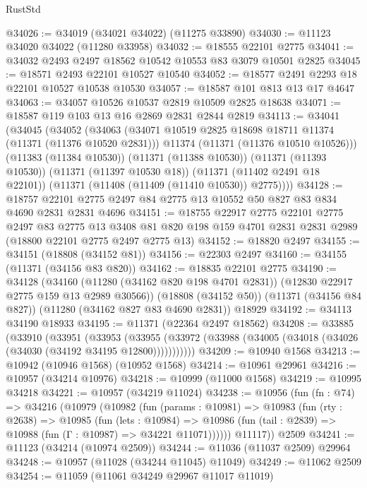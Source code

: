 \begin{lexlean}{RustStd}
\begin{coremodule}
@34026 := @34019 (@34021 @34022) (@11275 @33890)
@34030 := @11123 @34020 @34022 (@11280 @33958)
@34032 := @18555 @22101 @2775
@34041 := @34032 @2493 @2497 @18562 @10542 @10553 @83 @3079 @10501 @2825
@34045 := @18571 @2493 @22101 @10527 @10540
@34052 := @18577 @2491 @2293 @18 @22101 @10527 @10538 @10530
@34057 := @18587 @101 @813 @13 @17 @4647
@34063 := @34057 @10526 @10537 @2819 @10509 @2825 @18638
@34071 := @18587 @119 @103 @13 @16 @2869 @2831 @2844 @2819
@34113 := @34041
    (@34045
      (@34052
        (@34063
          (@34071 @10519 @2825 @18698 @18711 @11374 (@11371 (@11376 @10520 @2831)))
          @11374
          (@11371 (@11376 @10510 @10526)))
        (@11383 (@11384 @10530))
        (@11371 (@11388 @10530))
        (@11371 (@11393 @10530))
        (@11371 (@11397 @10530 @18))
        (@11371 (@11402 @2491 @18 @22101))
        (@11371 (@11408 (@11409 (@11410 @10530)) @2775))))
@34128 := @18757 @22101 @2775 @2497 @84 @2775 @13 @10552 @50 @827 @83 @834 @4690 @2831 @2831 @4696
@34151 := @18755
    @22917
    @2775
    @22101
    @2775
    @2497
    @83
    @2775
    @13
    @3408
    @81
    @820
    @198
    @159
    @4701
    @2831
    @2831
    @2989
    (@18800 @22101 @2775 @2497 @2775 @13)
@34152 := @18820 @2497
@34155 := @34151 (@18808 (@34152 @81))
@34156 := @22303 @2497
@34160 := @34155 (@11371 (@34156 @83 @820))
@34162 := @18835 @22101 @2775
@34190 := @34128
    (@34160 (@11280 (@34162 @820 @198 @4701 @2831)) (@12830 @22917 @2775 @159 @13 @2989 @30566))
    (@18808 (@34152 @50))
    (@11371 (@34156 @84 @827))
    (@11280 (@34162 @827 @83 @4690 @2831))
    @18929
@34192 := @34113 @34190 @18933
@34195 := @11371 (@22364 @2497 @18562)
@34208 := @33885
    (@33910
      (@33951
        (@33953
          (@33955 (@33972 (@33988 (@34005 (@34018 (@34026 (@34030 (@34192 @34195 @12800)))))))))))
@34209 := @10940 @1568
@34213 := @10942 (@10946 @1568) (@10952 @1568)
@34214 := @10961 @29961
@34216 := @10957 (@34214 @10976)
@34218 := @10999 (@11000 @1568)
@34219 := @10995 @34218
@34221 := @10957 (@34219 @11024)
@34238 := @10956
    (fun (fn : @74) =>
    @34216
      (@10979
        (@10982
          (fun (params : @10981) =>
          @10983
            (fun (rty : @2638) =>
            @10985
              (fun (lets : @10984) =>
              @10986 (fun (tail : @2839) => @10988 (fun (Γ : @10987) => @34221 @11071))))))
        @11117))
    @2509
@34241 := @11123 (@34214 (@10974 @2509))
@34244 := @11036 (@11037 @2509) @29964
@34248 := @10957 (@11028 (@34244 @11045) @11049)
@34249 := @11062 @2509
@34254 := @11059 (@11061 @34249 @29967 @11017 @11019)

\end{coremodule}
\end{lexlean}
